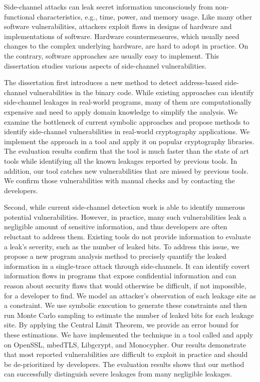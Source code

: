 
Side-channel attacks can leak secret information unconsciously from non-functional characteristics, e.g., time, power, and memory usage. Like many other software vulnerabilities, attackers exploit flaws in designs of hardware and implementations of software. Hardware countermeasures, which usually need changes to the complex underlying hardware, are hard to adopt in practice. On the contrary, software approaches are usually easy to implement. This dissertation studies various aspects of side-channel vulnerabilities.

The dissertation first introduces a new method to detect address-based side-channel vulnerabilities in the binary code. While existing approaches can identify side-channel leakages in real-world programs, many of them are computationally expensive and need to apply domain knowledge to simplify the analysis.  We examine the bottleneck of current symbolic approaches and propose methods to identify side-channel vulnerabilities in real-world cryptography applications. We implement the approach in a tool and apply it on popular cryptography libraries. The evaluation results confirm that the tool is much faster than the state of art tools while identifying all the known leakages reported by previous tools. In addition, our tool catches new vulnerabilities that are missed by previous tools. We confirm those vulnerabilities with manual checks and by contacting the developers.

Second, while current side-channel detection work is able to identify numerous potential vulnerabilities. However, in practice, many such vulnerabilities leak a negligible amount of sensitive information, and thus developers are often reluctant to address them. Existing tools do not provide information to evaluate a leak’s severity, such as the number of leaked bits. To address this issue, we propose a new program analysis method to precisely quantify the leaked information in a single-trace attack through side-channels. It can identify covert information flows in programs that expose confidential information and can reason about security flaws that would otherwise be difficult, if not impossible, for a developer to find. We model an attacker’s observation of each leakage site as a constraint. We use symbolic execution to generate these constraints and then run Monte Carlo sampling to estimate the number of leaked bits for each leakage site. By applying the Central Limit Theorem, we provide an error bound for these estimations. We have implemented the technique in a tool called \tool{} and apply \tool{} on OpenSSL, mbedTLS, Libgcrypt, and Monocypher. Our results demonstrate that most reported vulnerabilities are difficult to exploit in practice and should be de-prioritized by developers. The evaluation results shows that our method can successfully distinguish severe leakages from many negligible leakages. 


